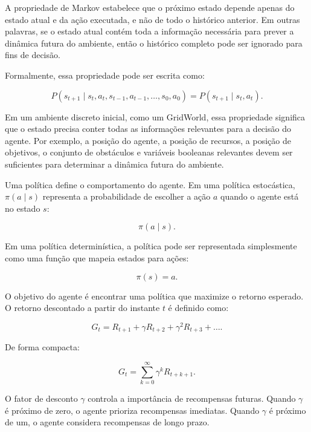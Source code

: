 A propriedade de Markov estabelece que o próximo estado depende apenas do
estado atual e da ação executada, e não de todo o histórico anterior.
Em outras palavras, se o estado atual contém toda a informação necessária para
prever a dinâmica futura do ambiente, então o histórico completo pode ser ignorado
para fins de decisão.

Formalmente, essa propriedade pode ser escrita como:

\begin{equation}
P(s_{t+1} \mid s_t,a_t,s_{t-1},a_{t-1},\dots,s_0,a_0)
=
P(s_{t+1} \mid s_t,a_t).
\end{equation}

Em um ambiente discreto inicial, como um GridWorld, essa propriedade significa
que o estado precisa conter todas as informações relevantes para a decisão do
agente.
Por exemplo, a posição do agente, a posição de recursos, a posição de objetivos,
o conjunto de obstáculos e variáveis booleanas relevantes devem ser suficientes
para determinar a dinâmica futura do ambiente.

Uma política define o comportamento do agente.
Em uma política estocástica, $\pi(a \mid s)$ representa a probabilidade de
escolher a ação $a$ quando o agente está no estado $s$:

\begin{equation}
\pi(a \mid s).
\end{equation}

Em uma política determinística, a política pode ser representada simplesmente
como uma função que mapeia estados para ações:

\begin{equation}
\pi(s) = a.
\end{equation}

O objetivo do agente é encontrar uma política que maximize o retorno esperado.
O retorno descontado a partir do instante $t$ é definido como:

\begin{equation}
G_t =
R_{t+1}
+
\gamma R_{t+2}
+
\gamma^2 R_{t+3}
+
\dots.
\end{equation}

De forma compacta:

\begin{equation}
G_t =
\sum_{k=0}^{\infty} \gamma^k R_{t+k+1}.
\end{equation}

O fator de desconto $\gamma$ controla a importância de recompensas futuras.
Quando $\gamma$ é próximo de zero, o agente prioriza recompensas imediatas.
Quando $\gamma$ é próximo de um, o agente considera recompensas de longo
prazo.

